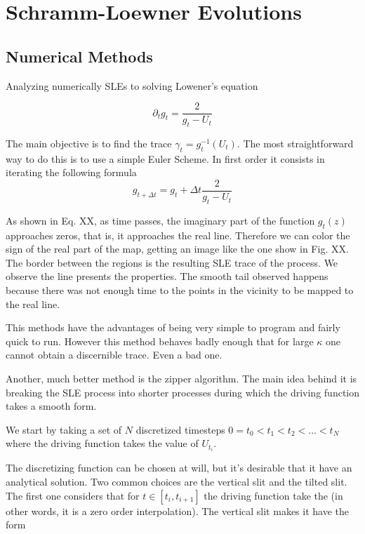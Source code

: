 \chapter{Schramm-Loewner Evolutions}
\label{ch:sle}

\section{Numerical Methods}
\label{sec:numsle}

Analyzing numerically SLEs to solving Lowener's equation

\begin{equation}
    \partial_t g_t = \frac{2}{g_t - U_t}
\end{equation}

The main objective is to find the trace $\gamma_t = g_t^{-1}(U_t)$. The most
straightforward way to do this is to use a simple Euler Scheme. In first order
it consists in iterating the following formula
\begin{equation}
    g_{t+\Delta t} = g_t + \Delta t \frac{2}{g_t - U_t}
\end{equation}

As shown in Eq. XX, as time passes, the imaginary part of the function $g_t(z)$
approaches zeros, that is, it approaches the real line. Therefore we can color
the sign of the real part of the map, getting an image like the one show in
Fig. XX. The border between the regions is the resulting SLE trace of the
process. We observe the line presents the properties. The smooth tail observed
happens because there was not enough time to the points in the vicinity to be
mapped to the real line.

This methods have the advantages of being very simple to program and fairly
quick to run. However this method behaves badly enough that for large $\kappa$ 
one cannot obtain a discernible trace. Even a bad one.

Another, much better method is the zipper algorithm. The main idea behind it is
breaking the SLE process into shorter processes during which the driving function
takes a smooth form. 

We start by taking a set of $N$ discretized timesteps $0=t_0 < t_1 < t_2 <
\ldots < t_N$ where the driving function takes the value of $U_{t_i}$.

The discretizing function can be chosen at will, but it's desirable that
it have an analytical solution. Two common choices are the vertical slit and
the tilted slit. The first one considers that for $t\in[t_i, t_{i+1}]$ the
driving function take the (in other words, it is a zero order interpolation).
The vertical slit makes it have the form


